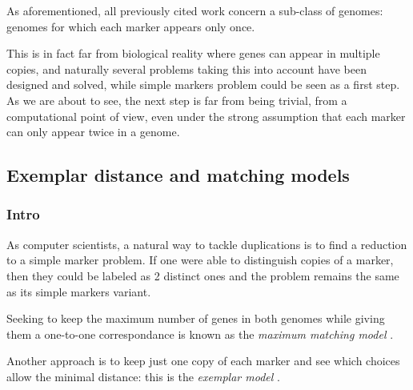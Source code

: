 \documentclass[11pt,final,twoside,nofrench]{thlifl}
\begin{document}
As aforementioned, all previously cited work concern a sub-class of genomes: genomes for which each marker appears only once.

This is in fact far from biological reality where genes can appear in multiple copies, and naturally several problems taking this into account have been designed and solved, while simple markers problem could be seen as a first step. As we are about to see, the next step is far from being trivial, from a computational point of view, even under the strong assumption that each marker can only appear twice in a genome.

\subsection{Exemplar distance and matching models}

\subsubsection*{Intro}

As computer scientists, a natural way to tackle duplications is to find a reduction to a simple marker problem. If one were able to distinguish copies of a marker, then they could be labeled as 2 distinct ones and the problem remains the same as its simple markers variant. 

Seeking to keep the maximum number of genes in both genomes while giving them a one-to-one correspondance is known as the \emph{maximum matching model} \cite{BFC04}.

Another approach is to keep just one copy of each marker and see which choices allow the minimal distance: this is the \emph{exemplar model} \cite{S99}.
\end{document}
